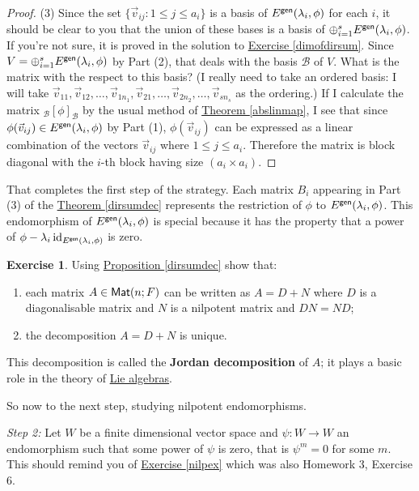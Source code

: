 \documentclass[11pt]{amsbook}
\DeclareMathOperator{\id}{\mathrm{id}}
\theoremstyle{definition}
\newtheorem{exercise}{Exercise}
\begin{document}
\begin{proof}
(3) Since the set $\{ \vec{v}_{ij}: 1\leqslant j \leqslant a_i \}$ is a basis of $E^{\sf gen}(\lambda_i , \phi)$ for each $i$,  it should be clear to you that the union of these bases is a basis of $\oplus_{i=1}^s E^{\sf gen}(\lambda_i, \phi)$. If you're not sure, it is proved in the solution to \hyperref[dimofdirsum]{Exercise \ref{dimofdirsum}}. Since $V = \oplus_{i=1}^s E^{\sf gen}(\lambda_i, \phi)$ by Part (2), that deals with 
the  basis $\mathcal B$ of $V$. What is the matrix with the respect to this basis? (I really need to take an ordered basis: I will take $\vec{v}_{11}, \vec{v}_{12}, \ldots , \vec{v}_{1n_1}, \vec{v}_{21}, \ldots , \vec{v}_{2n_2}, \ldots , \vec{v}_{sn_s}$ as the ordering.) If I calculate the matrix ${}_{\mathcal{B}}[\phi]_{\mathcal{B}}$ by the usual method of \hyperref[abslinmap]{Theorem \ref{abslinmap}}, I see that since $\phi(\vec{v}_{ij}) \in E^{\sf gen}(\lambda_i, \phi)$ by Part (1), $\phi (\vec{v}_{ij})$ can be expressed as a linear combination of the vectors $\vec{v}_{ij}$ where $1\leqslant  j \leqslant a_i$. Therefore the matrix is block diagonal with the $i$-th block having size $(a_i\times a_i)$.
\end{proof}

That completes the first step of the strategy. Each matrix $B_i$ appearing in Part (3) of the \hyperref[dirsumdec]{Theorem \ref{dirsumdec}} represents the restriction of $\phi$ to $E^{\sf gen}(\lambda_i, \phi)$. This endomorphism of $E^{\sf gen}(\lambda_i, \phi)$ is special because it has the property that a power of $\phi-\lambda_i \id_{E^{\sf gen}(\lambda_i, \phi)}$ is zero.

\begin{exercise} Using \hyperref[dirsumdec]{Proposition \ref{dirsumdec}} show that:
\begin{enumerate}
\item each matrix $A\in {\sf Mat}(n;F)$ can be written as $A = D + N$ where $D$ is a diagonalisable matrix and $N$ is a nilpotent matrix and $DN = ND$;
\item the decomposition $A = D + N$ is unique.
\end{enumerate}
This decomposition is called the {\bf Jordan decomposition} of $A$; it plays a basic role in the theory of \href{http://en.wikipedia.org/wiki/Lie_algebra}{Lie algebras}.
\end{exercise}

So now to the next step, studying nilpotent endomorphisms.

\medskip

\noindent
{\it Step 2:}
Let $W$ be a finite dimensional vector space and $\psi: W\to W$ an endomorphism such that some power of $\psi$ is zero, that is $\psi^m = 0 $ for some $m$. This should remind you of \hyperref[nilpex]{Exercise \ref{nilpex}} which was also Homework 3, Exercise 6.
\end{document}

